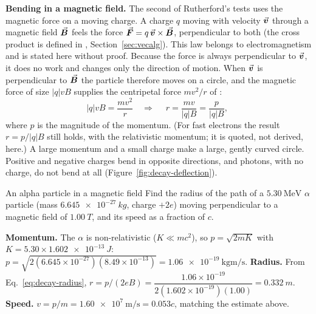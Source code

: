\textbf{Bending in a magnetic field.} The second of Rutherford's tests uses the magnetic force on a moving
charge. A charge $q$ moving with velocity $\vec{\bm{v}}$ through a magnetic field $\vec{\bm{B}}$ feels the force
$\vec{\bm{F}}=q\,\vec{\bm{v}}\times\vec{\bm{B}}$, perpendicular to both (the cross product is defined in ,
Section~\ref{sec:vecalg}). This law belongs to electromagnetism and is stated here without proof. Because
the force is always perpendicular to $\vec{\bm{v}}$, it does no work and changes only the direction of motion. When
$\vec{\bm{v}}$ is perpendicular to $\vec{\bm{B}}$ the particle therefore moves on a circle, and the magnetic force of size
$|q|vB$ supplies the centripetal force $mv^2/r$ of :
\begin{equation}\label{eq:decay-radius}
|q|vB=\frac{mv^2}{r}\quad\Longrightarrow\quad \boxed{\;r=\frac{mv}{|q|B}=\frac{p}{|q|B},\;}
\end{equation}
where $p$ is the magnitude of the momentum. (For fast electrons the result $r=p/|q|B$ still holds,
with the relativistic momentum; it is quoted, not derived, here.) A large momentum and a small charge
make a large, gently curved circle. Positive and negative charges bend in opposite directions, and
photons, with no charge, do not bend at all (Figure~\ref{fig:decay-deflection}).

\begin{figure}[htbp]
\centering
{}
\end{figure}

\begin{exbox}{An alpha particle in a magnetic field}\label{ex:decay-alpharadius}
Find the radius of the path of a $\SI{5.30}{\MeV}$ $\alpha$ particle (mass $\SI{6.645e-27}{kg}$, charge
$+2e$) moving perpendicular to a magnetic field of $\SI{1.00}{T}$, and its speed as a fraction of $c$.

 \textbf{Momentum.} The $\alpha$ is non-relativistic ($K\ll mc^2$), so $p=\sqrt{2mK}$ with
$K=5.30\times\SI{1.602e-13}{J}$:
$p=\sqrt{2(6.645\times10^{-27})(8.49\times10^{-13})}=\SI{1.06e-19}{\kilo\gram\metre\per\second}$.
 \textbf{Radius.} From Eq.~\eqref{eq:decay-radius}, $r=p/(2eB)=
\dfrac{1.06\times10^{-19}}{2(1.602\times10^{-19})(1.00)}=\SI{0.332}{m}$.
 \textbf{Speed.} $v=p/m=\SI{1.60e7}{\metre\per\second}=0.053c$, matching the estimate above.
\end{exbox}

